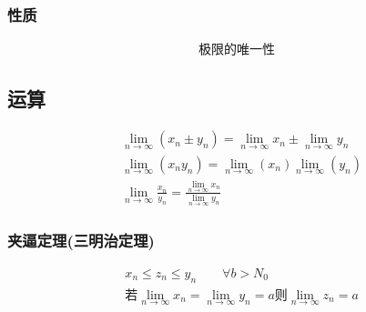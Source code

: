 \subsubsection{性质}
\begin{align}
\mbox{极限的唯一性}\label{limit_sequence}
\end{align}
\subsection{运算}
\begin{align}
&\lim\limits_{n\to\infty}{(x_n\pm y_n)} = \lim\limits_{n\to\infty}x_n\pm\lim\limits_{n\to\infty}y_n \\
&\lim\limits_{n\to\infty}{(x_n y_n)} = \lim\limits _{n\to\infty}(x_n)\lim\limits_{n\to\infty}(y_n) \\
&\lim\limits_{n\to\infty}{\frac{x_n}{y_n}} = \frac{\lim\limits_{n\to\infty}{x_n}}{\lim\limits_{n\to\infty}{y_n}}
\end{align}
\subsubsection{夹逼定理(三明治定理)}
\begin{equation}\label{eq:squeeze_theorem}
\begin{split}
&x_n\leqslant z_n\leqslant y_n \qquad \forall b>N_0 \\
&\mbox{若}\lim\limits_{n\to{\infty}}x_n = \lim\limits_{n\to\infty}y_n = a \mbox{则}\lim\limits_{n\to\infty}z_n = a
\end{split}
\end{equation}
